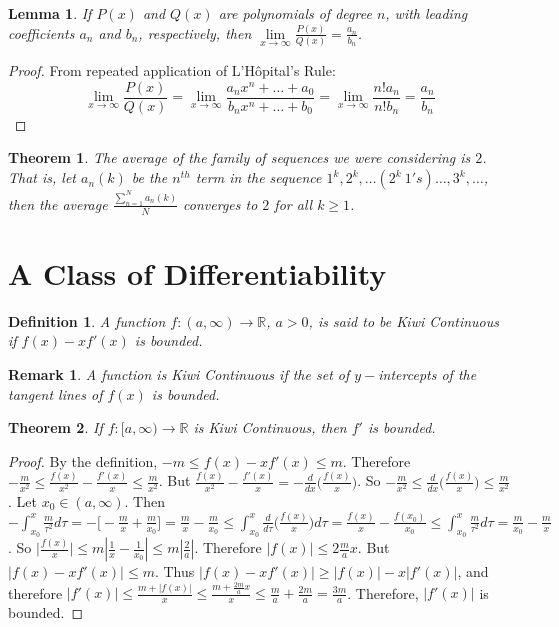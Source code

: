 \documentclass[crop=false,class=book]{standalone}
\theoremstyle{mystyle}
\newtheorem{theorem}{Theorem}[section]
\newtheorem{definition}{Definition}[section]
\newtheorem{lemma}{Lemma}[section]
\newtheorem{remark}{Remark}[section]
\begin{document}
\begin{lemma}
If $P(x)$ and $Q(x)$ are polynomials of degree $n$, with leading coefficients $a_n$ and $b_n$, respectively, then $\underset{x\rightarrow \infty}\lim \frac{P(x)}{Q(x)} = \frac{a_n}{b_n}$.
\end{lemma}
\begin{proof}
From repeated application of L'H\^{o}pital's Rule:
\begin{equation*}
    \underset{x\rightarrow \infty}\lim \frac{P(x)}{Q(x)} = \underset{x\rightarrow \infty}\lim \frac{a_n x^n + \hdots + a_0}{b_n x^n + \hdots + b_0} = \underset{x\rightarrow \infty} \lim\frac{n! a_n}{n! b_n} = \frac{a_n}{b_n}
\end{equation*}
\end{proof}
\begin{theorem}
The average of the family of sequences we were considering is $2$. That is, let $a_n(k)$ be the $n^{th}$ term in the sequence $1^k, 2^k, \hdots (2^k\ 1's)\hdots,3^k,\hdots$, then the average $\frac{\sum_{n=1}^{N} a_n(k)}{N}$ converges to $2$ for all $k\geq 1$.
\end{theorem}
\section{A Class of Differentiability}
\begin{definition}
A function $f:(a,\infty)\rightarrow \mathbb{R}$, $a>0$, is said to be Kiwi Continuous if $f(x)-xf'(x)$ is bounded.
\end{definition}
\begin{remark}
A function is Kiwi Continuous if the set of $y-$intercepts of the tangent lines of $f(x)$ is bounded. 
\end{remark}
\begin{theorem}
If $f:[a,\infty)\rightarrow \mathbb{R}$ is Kiwi Continuous, then $f'$ is bounded.
\end{theorem}
\begin{proof}
By the definition, $-m \leq f(x)-xf'(x)\leq m$. Therefore $-\frac{m}{x^2} \leq \frac{f(x)}{x^2}- \frac{f'(x)}{x} \leq \frac{m}{x^2}$. But $\frac{f(x)}{x^2} - \frac{f'(x)}{x} = -\frac{d}{dx}\big(\frac{f(x)}{x}\big)$. So $-\frac{m}{x^2} \leq \frac{d}{dx}\big(\frac{f(x)}{x}\big) \leq \frac{m}{x^2}$. Let $x_0 \in (a,\infty)$. Then $-\int_{x_0}^x \frac{m}{\tau^2}d\tau = -\big[-\frac{m}{x}+ \frac{m}{x_0}\big] = \frac{m}{x}- \frac{m}{x_0} \leq \int_{x_0}^{x}\frac{d}{d\tau}\big(\frac{f(x)}{x}\big)d\tau = \frac{f(x)}{x} - \frac{f(x_0)}{x_0} \leq \int_{x_0}^{x} \frac{m}{\tau^2}d\tau = \frac{m}{x_0} - \frac{m}{x}$. So $\big|\frac{f(x)}{x}\big| \leq m|\frac{1}{x} - \frac{1}{x_0}| \leq m|\frac{2}{a}|$. Therefore $|f(x)| \leq 2\frac{m}{a}x$. But $|f(x) - xf'(x)| \leq m$. Thus $|f(x)-xf'(x)| \geq |f(x)| - x|f'(x)|$, and therefore $|f'(x)|  \leq \frac{m+|f(x)|}{x} \leq \frac{m+ \frac{2m}{a}x}{x} \leq \frac{m}{a} + \frac{2m}{a} = \frac{3m}{a}$. Therefore, $|f'(x)|$ is bounded.
\end{proof}
\end{document}
